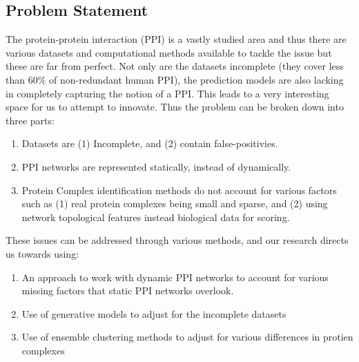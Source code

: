 \documentclass[11pt]{article}
\begin{document}
    \subsection{Problem Statement}
    
    The protein-protein interaction (PPI) is a vastly studied area and thus there are various datasets and computational methods available to tackle the issue but these are far from perfect. Not only are the datasets incomplete (they cover less than 60\% of non-redundant human PPI), the prediction models are also lacking in completely capturing the notion of a PPI. This leads to a very interesting space for us to attempt to innovate. Thus the problem can be broken down into three parts:
    
    \begin{enumerate}
        \item Datasets are (1) Incomplete, and (2) contain false-positivies.
        \item PPI networks are represented statically, instead of dynamically.
        \item Protein Complex identification methods do not account for various factors such as (1) real protein complexes being small and sparse, and (2) using network topological features instead biological data for scoring. 
    \end{enumerate}
    
    These issues can be addressed through various methods, and our research directs us towards using: 
    \begin{enumerate}
        \item An approach to work with dynamic PPI networks to account for various missing factors that static PPI networks overlook.
        \item Use of generative models to adjust for the incomplete datasets
        \item Use of ensemble clustering methods to adjust for various differences in protien complexes
    \end{enumerate}
    
    
        
        
\end{document}
